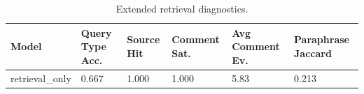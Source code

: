 \begin{table}[h]
\centering
\caption{Extended retrieval diagnostics.}
\label{tab:diagnostic-metrics}
\begin{tabular}{llllll}
\hline
Model & Query Type Acc. & Source Hit & Comment Sat. & Avg Comment Ev. & Paraphrase Jaccard \\
\hline
retrieval\_only & 0.667 & 1.000 & 1.000 & 5.83 & 0.213 \\
\hline
\end{tabular}
\end{table}